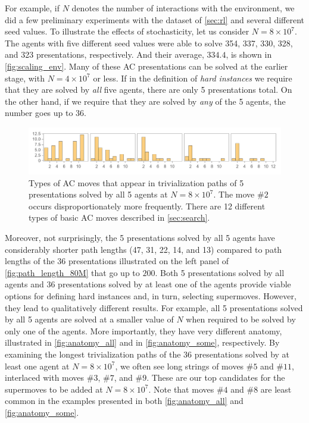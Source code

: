 For example, if $N$ denotes the number of interactions with the environment, we did a few preliminary experiments with the dataset of \autoref{sec:rl} and several different seed values. To illustrate the effects of stochasticity, let us consider $N=8 \times 10^7$. The agents with five different seed values were able to solve 354, 337, 330, 328, and 323 presentations, respectively. And their average, $334.4$, is shown in \autoref{fig:scaling_env}. Many of these AC presentations can be solved at the earlier stage, with $N=4 \times 10^7$ or less. If in the definition of \textit{hard instances} we require that they are solved by \textit{all} five agents, there are only 5 presentations total. On the other hand, if we require that they are solved by \textit{any} of the 5 agents, the number goes up to 36.

\begin{figure}[h]
	\centering
	\includegraphics[scale=0.6]{fig/anatomy_all.png}
	\caption{Types of AC moves that appear in trivialization paths of 5 presentations solved by all 5 agents at $N=8 \times 10^7$. The move $\# 2$ occurs disproportionately more frequently. There are 12 different types of basic AC moves described in \autoref{sec:search}.}
	\label{fig:anatomy_all}
\end{figure}

Moreover, not surprisingly, the 5 presentations solved by all 5 agents have considerably shorter path lengths (47, 31, 22, 14, and 13) compared to path lengths of the 36 presentations illustrated on the left panel of \autoref{fig:path_length_80M} that go up to $200$. Both 5 presentations solved by all agents and 36 presentations solved by at least one of the agents provide viable options for defining hard instances and, in turn, selecting supermoves. However, they lead to qualitatively different results. For example, all 5 presentations solved by all 5 agents are solved at a smaller value of $N$ when required to be solved by only one of the agents. More importantly, they have very different anatomy, illustrated in \autoref{fig:anatomy_all} and in \autoref{fig:anatomy_some}, respectively.
By examining the longest trivialization paths of the 36 presentations solved by at least one agent at $N=8 \times 10^7$, we often see long strings of moves $\# 5$ and $\# 11$, interlaced with moves $\# 3$, $\# 7$, and $\# 9$. These are our top candidates for the supermoves to be added at $N=8 \times 10^7$.
Note that moves $\# 4$ and $\# 8$ are least common in the examples presented in both \autoref{fig:anatomy_all} and \autoref{fig:anatomy_some}.

